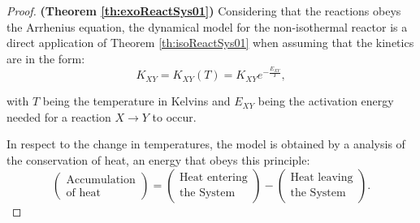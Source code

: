 \documentclass[a4paper,11pt]{book}
\numberwithin{figure}{chapter}
\numberwithin{equation}{chapter}
\numberwithin{table}{chapter}
\theoremstyle{definition}
\begin{document}
\begin{proof}{\textbf{(Theorem \ref{th:exoReactSys01})}}
    Considering that the reactions obeys the Arrhenius equation, the dynamical model for the non-isothermal reactor is a direct application of Theorem \ref{th:isoReactSys01} when assuming that the kinetics are in the form:
    \begin{equation}
        K_{XY} = K_{XY}(T) = K_{XY} e^{-\frac{E_{XY}}{T}} 
    ,\end{equation}
    
    \noindent with $T$ being the temperature in Kelvins and $E_{XY}$ being the activation energy needed for a reaction $X \rightarrow Y$ to occur.

    In respect to the change in temperatures, the model is obtained by a analysis of the conservation of heat, an energy that obeys this principle: 
    \begin{equation} \label{eq:jacket01}
        \begin{pmatrix}
            \text{Accumulation} \\ \text{of heat}
        \end{pmatrix} = \begin{pmatrix}
            \text{Heat entering} \\ \text{the System}
        \end{pmatrix} - \begin{pmatrix}
            \text{Heat leaving} \\ \text{the System}
        \end{pmatrix}
    .\end{equation}
    

\end{proof}
\end{document}
